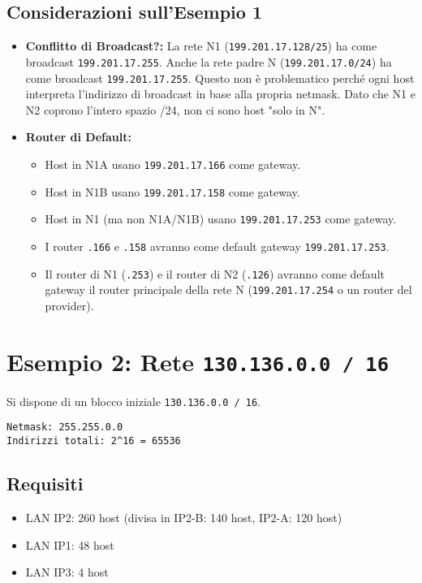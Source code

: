 \subsection{Considerazioni sull'Esempio 1}
\begin{itemize}
    \item \textbf{Conflitto di Broadcast?:} La rete N1 (\texttt{199.201.17.128/25}) ha come broadcast \texttt{199.201.17.255}. Anche la rete padre N (\texttt{199.201.17.0/24}) ha come broadcast \texttt{199.201.17.255}. Questo non è problematico perché ogni host interpreta l'indirizzo di broadcast in base alla propria netmask. Dato che N1 e N2 coprono l'intero spazio /24, non ci sono host "solo in N".
    \item \textbf{Router di Default:}
    \begin{itemize}
        \item Host in N1A usano \texttt{199.201.17.166} come gateway.
        \item Host in N1B usano \texttt{199.201.17.158} come gateway.
        \item Host in N1 (ma non N1A/N1B) usano \texttt{199.201.17.253} come gateway.
        \item I router \texttt{.166} e \texttt{.158} avranno come default gateway \texttt{199.201.17.253}.
        \item Il router di N1 (\texttt{.253}) e il router di N2 (\texttt{.126}) avranno come default gateway il router principale della rete N (\texttt{199.201.17.254} o un router del provider).
    \end{itemize}
\end{itemize}

\newpage
\section{Esempio 2: Rete \texttt{130.136.0.0 / 16}}
Si dispone di un blocco iniziale \texttt{130.136.0.0 / 16}.
\begin{verbatim}
Netmask: 255.255.0.0
Indirizzi totali: 2^16 = 65536
\end{verbatim}

\subsection{Requisiti}
\begin{itemize}
    \item LAN IP2: 260 host (divisa in IP2-B: 140 host, IP2-A: 120 host)
    \item LAN IP1: 48 host
    \item LAN IP3: 4 host
\end{itemize}

